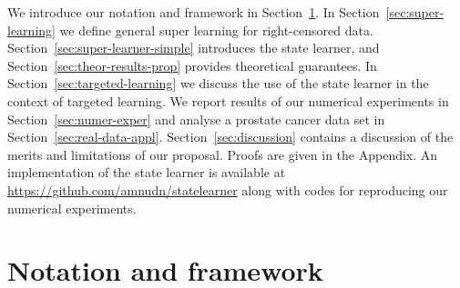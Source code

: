 \documentclass[11pt]{article}
\theoremstyle{thmstyleone}%
\theoremstyle{thmstyletwo}%
\theoremstyle{thmstylethree}%
\newcommand{\1}{\mathds{1}}
\begin{document}
We introduce our notation and framework in Section~\ref{sec:framework}. In
Section~\ref{sec:super-learning} we define general super learning for
right-censored data. Section~\ref{sec:super-learner-simple} introduces the state
learner, and Section~\ref{sec:theor-results-prop} provides theoretical
guarantees. In Section~\ref{sec:targeted-learning} we discuss the use of the
state learner in the context of targeted learning. We report results of our
numerical experiments in Section~\ref{sec:numer-exper} and analyse a prostate
cancer data set in Section~\ref{sec:real-data-appl}.
Section~\ref{sec:discussion} contains a discussion of the merits and limitations
of our proposal. Proofs are given in the Appendix. An implementation of the
state learner is available at \url{https://github.com/amnudn/statelearner} along
with codes for reproducing our numerical experiments.


\section{Notation and framework}
\label{sec:framework}
\end{document}
